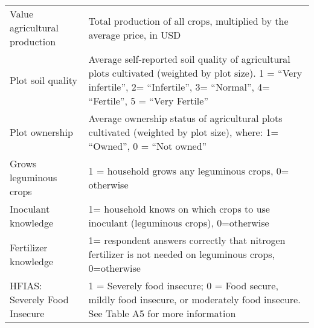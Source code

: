 \begin{table}[htbp]
\begin{tabular}{p{}p{}}
	Value agricultural production & Total production of all crops, multiplied by the average price, in USD\\
	Plot soil quality  & Average self-reported soil quality of agricultural plots cultivated (weighted by plot size). 1 = “Very infertile”, 2= “Infertile”, 3= “Normal”, 4= “Fertile”, 5 = “Very Fertile”\\
	Plot ownership & Average ownership status of agricultural plots cultivated (weighted by plot size), where: 1= “Owned”, 0 = “Not owned”\\
	Grows leguminous crops & 1 = household grows any leguminous crops, 0= otherwise\\
	Inoculant knowledge  & 1= household knows on which crops to use inoculant (leguminous crops), 0=otherwise\\
	Fertilizer knowledge  & 1= respondent answers correctly that nitrogen fertilizer is not needed on leguminous crops, 0=otherwise\\
	HFIAS: Severely Food Insecure & 1 = Severely food insecure; 0 = Food secure, mildly food insecure, or moderately food insecure. See Table A5 for more information\\


    \bottomrule
    \end{tabular}%
    \egroup
\end{table}%







